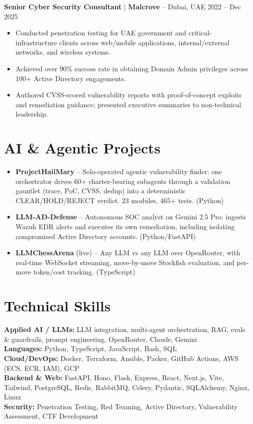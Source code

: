\documentclass[10pt,a4paper]{article}
\begin{document}
{\small\textbf{Senior Cyber Security Consultant} | \textbf{Malcrove} -- Dubai, UAE \hfill 2022 -- Dec 2025}
\begin{itemize}
    \item {\small Conducted penetration testing for UAE government and critical-infrastructure clients across web/mobile applications, internal/external networks, and wireless systems.}
    \item {\small Achieved over 90\% success rate in obtaining Domain Admin privileges across 100+ Active Directory engagements.}
    \item {\small Authored CVSS-scored vulnerability reports with proof-of-concept exploits and remediation guidance; presented executive summaries to non-technical leadership.}
\end{itemize}

\section{AI \& Agentic Projects}
\begin{itemize}
    \item {\small \textbf{ProjectHailMary} -- Solo-operated agentic vulnerability finder: one orchestrator drives 60+ charter-bearing subagents through a validation gauntlet (trace, PoC, CVSS, dedup) into a deterministic CLEAR/HOLD/REJECT verdict. 23 modules, 465+ tests. (Python)}
    \item {\small \textbf{LLM-AD-Defense} -- Autonomous SOC analyst on Gemini 2.5 Pro: ingests Wazuh EDR alerts and executes its own remediation, including isolating compromised Active Directory accounts. (Python/FastAPI)}
    \item {\small \textbf{LLMChessArena} (live) -- Any LLM vs any LLM over OpenRouter, with real-time WebSocket streaming, move-by-move Stockfish evaluation, and per-move token/cost tracking. (TypeScript)}
\end{itemize}

\section{Technical Skills}
{\small
\textbf{Applied AI / LLMs:} LLM integration, multi-agent orchestration, RAG, evals \& guardrails, prompt engineering, OpenRouter, Claude, Gemini\\
\textbf{Languages:} Python, TypeScript, JavaScript, Bash, SQL\\
\textbf{Cloud/DevOps:} Docker, Terraform, Ansible, Packer, GitHub Actions, AWS (ECS, ECR, IAM), GCP\\
\textbf{Backend \& Web:} FastAPI, Hono, Flask, Express, React, Next.js, Vite, Tailwind, PostgreSQL, Redis, RabbitMQ, Celery, Pydantic, SQLAlchemy, Nginx, Linux\\
\textbf{Security:} Penetration Testing, Red Teaming, Active Directory, Vulnerability Assessment, CTF Development
}
\end{document}
